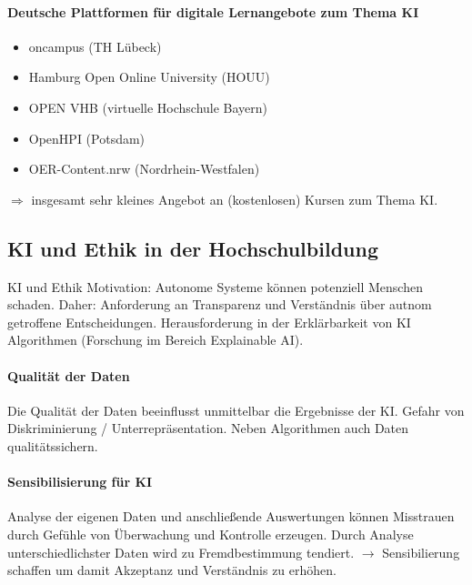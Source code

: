 \paragraph*{Deutsche Plattformen für digitale Lernangebote zum Thema KI}
\begin{itemize}
    \item oncampus (TH Lübeck)
    \item Hamburg Open Online University (HOUU)
    \item OPEN VHB (virtuelle Hochschule Bayern)
    \item OpenHPI (Potsdam)
    \item OER-Content.nrw (Nordrhein-Westfalen)
\end{itemize}
$\Rightarrow$ insgesamt sehr kleines Angebot an (kostenlosen) Kursen zum Thema KI.

\subsection{KI und Ethik in der Hochschulbildung}
KI und Ethik Motivation: Autonome Systeme können potenziell Menschen schaden. Daher: Anforderung an Transparenz und Verständnis über autnom getroffene Entscheidungen. Herausforderung in der Erklärbarkeit von KI Algorithmen (Forschung im Bereich \glqq Explainable AI\grqq{}).

\paragraph*{Qualität der Daten} Die Qualität der Daten beeinflusst unmittelbar die Ergebnisse der KI. Gefahr von Diskriminierung / Unterrepräsentation. Neben Algorithmen auch Daten qualitätssichern.

\paragraph*{Sensibilisierung für KI} Analyse der eigenen Daten und anschließende Auswertungen können Misstrauen durch Gefühle von Überwachung und Kontrolle erzeugen. Durch Analyse unterschiedlichster Daten wird zu Fremdbestimmung tendiert. $\rightarrow$ Sensibilierung schaffen um damit Akzeptanz und Verständnis zu erhöhen.